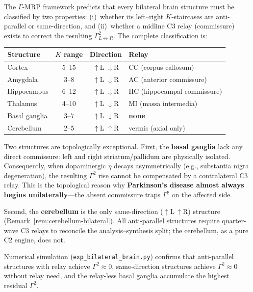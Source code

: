 \documentclass[aps,pre,twocolumn,superscriptaddress,floatfix]{revtex4-2}
\begin{document}
\begin{remark}
\label{rem:bilateral-topology}
The $\Gamma$-MRP framework predicts that every
bilateral brain structure must be classified by
two properties: (i)~whether its left--right
$K$-staircases are anti-parallel or same-direction,
and (ii)~whether a midline C3 relay (commissure)
exists to correct the resulting $\Gamma^2_{L
\leftrightarrow R}$.
The complete classification is:

\begin{center}
\renewcommand{\arraystretch}{1.15}
\begin{tabular}{@{}lccl@{}}
\toprule
Structure & $K$ range & Direction & Relay \\
\midrule
Cortex       & 5--15 & $\uparrow$L $\downarrow$R
  & CC (corpus callosum) \\
Amygdala     & 3--8  & $\uparrow$L $\downarrow$R
  & AC (anterior commissure) \\
Hippocampus  & 6--12 & $\uparrow$L $\downarrow$R
  & HC (hippocampal commissure) \\
Thalamus     & 4--10 & $\uparrow$L $\downarrow$R
  & MI (massa intermedia) \\
Basal ganglia& 3--7  & $\uparrow$L $\downarrow$R
  & \textbf{none} \\
Cerebellum   & 2--5  & $\uparrow$L $\uparrow$R
  & vermis (axial only) \\
\bottomrule
\end{tabular}
\end{center}

Two structures are topologically exceptional.
First, the \textbf{basal ganglia} lack any direct
commissure: left and right striatum/pallidum
are physically isolated.
Consequently, when dopaminergic $\eta$ decays
asymmetrically (e.g., substantia nigra degeneration),
the resulting $\Gamma^2$ rise cannot be compensated
by a contralateral C3 relay.
This is the topological reason why
\textbf{Parkinson's disease almost always begins
unilaterally}---the absent commissure traps
$\Gamma^2$ on the affected side.

Second, the \textbf{cerebellum} is the only
same-direction ($\uparrow$L$\,\uparrow$R) structure
(Remark~\ref{rem:cerebellum-bilateral}).
All anti-parallel structures require quarter-wave
C3 relays to reconcile the analysis--synthesis
split; the cerebellum, as a pure C2 engine,
does not.

Numerical simulation (\texttt{exp\_bilateral\_brain.py})
confirms that anti-parallel structures with relay
achieve $\Gamma^2 \approx 0$, same-direction
structures achieve $\Gamma^2 \approx 0$ without
relay need, and the relay-less basal ganglia
accumulate the highest residual $\Gamma^2$.
\end{remark}
\end{document}
